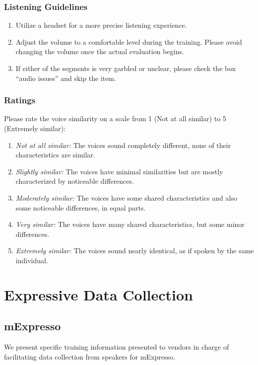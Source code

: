 \subsubsection{Listening Guidelines}
\begin{enumerate}
    \item Utilize a headset for a more precise listening experience.
    \item Adjust the volume to a comfortable level during the training. Please avoid changing the volume once the actual evaluation begins.
    \item If either of the segments is very garbled or unclear, please check the box “audio issues” and skip the item.
\end{enumerate}

\subsubsection{Ratings}
Please rate the voice similarity on a scale from 1 (Not at all similar) to 5 (Extremely similar):
\begin{enumerate}
    \item \textit{Not at all similar:} The voices sound completely different, none of their characteristics are similar.
    \item \textit{Slightly similar:} The voices have minimal similarities but are mostly characterized by noticeable differences.
    \item \textit{Moderately similar:} The voices have some shared characteristics and also some noticeable differences, in equal parts.
    \item \textit{Very similar:} The voices have many shared characteristics, but some minor differences.
    \item \textit{Extremely similar:} The voices sound nearly identical, as if spoken by the same individual.
\end{enumerate}

\FloatBarrier
\newpage
\section{Expressive Data Collection}
\label{sec:expressive_data_collection}

\subsection{mExpresso}
We present specific training information presented to vendors in charge of facilitating data collection from speakers for mExpresso.


